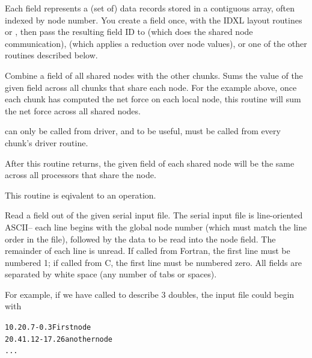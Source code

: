 \documentclass[10pt]{article}
\begin{document}
Each field represents a (set of) data records stored in a contiguous array,
often indexed by node number.  You create a field once, with the IDXL layout 
routines or ,
then pass the resulting field ID to  (which does the
shared node communication),  (which applies a
reduction over node values), or one of the other routines described below.



     Combine a field of all shared nodes with the other chunks.  Sums
     the value of the given field across all chunks that share each
     node.  For the example above, once each chunk has computed the net
     force on each local node, this routine will sum the net force
     across all shared nodes.

      can only be called from driver, and to be useful,
     must be called from every chunk's driver routine.

     After this routine returns, the given field of each shared node
     will be the same across all processors that share the node.
     
     This routine is eqivalent to an  operation.


     Read a field out of the given serial input file.  The serial input
     file is line-oriented ASCII-- each line begins with the global
     node number (which must match the line order in the file),
     followed by the data to be read into the node field.  The
     remainder of each line is unread.  If called from Fortran, the
     first line must be numbered 1; if called from C, the first line
     must be numbered zero.  All fields are separated by white space
     (any number of tabs or spaces).

     For example, if we have called  to describe 3 doubles,
     the input file could begin with

\begin{alltt}
          1    0.2    0.7    -0.3      First node
          2    0.4    1.12   -17.26    another node
          ...
\end{alltt}
\end{document}
